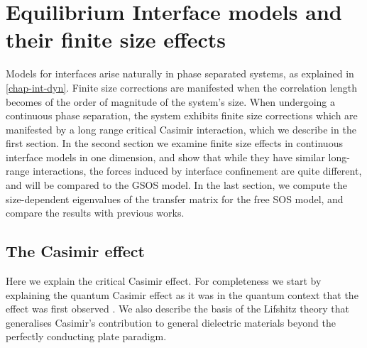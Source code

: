 \chapter{Equilibrium Interface models and their finite size effects}

Models for interfaces arise naturally in phase separated systems, as explained in \ref{chap-int-dyn}. Finite size corrections are manifested when the correlation length becomes of the order of magnitude of the system's size. When undergoing a continuous phase separation, the system exhibits finite size corrections which are manifested by a long range critical Casimir interaction, which we describe in the first section. In the second section we examine finite size effects in continuous interface models in one dimension, and show that while they have similar long-range interactions, the forces induced by interface confinement are quite different, and will be compared to the GSOS model. In the last section, we compute the size-dependent eigenvalues of the transfer matrix for the free SOS model, and compare the results with previous works.

\section{The Casimir effect}
\label{sec-casimir}

Here we explain the critical Casimir effect. For completeness we start by explaining the quantum Casimir effect as it was in the quantum context that the effect was first observed \cite{h_b_g_casimir_attraction_1948}.
We also describe the basis of the Lifshitz theory that generalises Casimir's contribution to 
general dielectric materials beyond the perfectly conducting plate paradigm.

